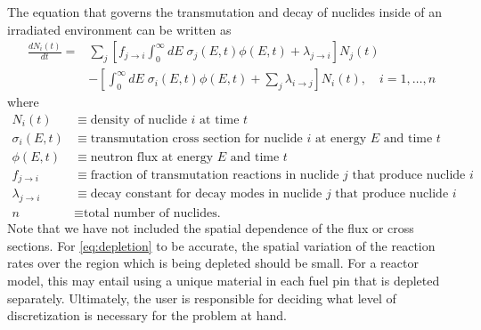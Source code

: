 \documentclass[3p,authoryear]{elsarticle}
\begin{document}
The equation that governs the transmutation and decay of nuclides inside of an
irradiated environment can be written as
\begin{equation}
  \label{eq:depletion}
  \begin{split}
  \frac{dN_i(t)}{dt} = &\sum\limits_j \left [ f_{j \rightarrow i}
  \int_0^\infty dE \; \sigma_j (E, t) \phi(E,t) + \lambda_{j\rightarrow i}
  \right ] N_j(t) \\ &- \left [\int_0^\infty dE \; \sigma_i (E,t) \phi(E,t) +
  \sum\limits_j \lambda_{i\rightarrow j} \right ] N_i(t), \quad i=1,\dots,n
  \end{split}
\end{equation}
where
\begin{equation*}
  \begin{split}
  N_i(t) &\equiv \text{density of nuclide $i$ at time $t$} \\
  \sigma_i(E,t) &\equiv \text{transmutation cross section for nuclide $i$ at energy $E$ and time $t$} \\
  \phi(E,t) &\equiv \text{neutron flux at energy $E$ and time $t$} \\
  f_{j \rightarrow i} &\equiv \text{fraction of transmutation reactions in nuclide $j$ that produce nuclide $i$} \\
  \lambda_{j \rightarrow i} &\equiv \text{decay constant for decay modes in nuclide $j$ that produce nuclide $i$} \\
  n &\equiv \text{total number of nuclides.}
  \end{split}
\end{equation*}
Note that we have not included the spatial dependence of the flux or cross
sections. For \cref{eq:depletion} to be accurate, the spatial variation of the
reaction rates over the region which is being depleted should be small. For a
reactor model, this may entail using a unique material in each fuel pin that is
depleted separately. Ultimately, the user is responsible for deciding what level
of discretization is necessary for the problem at hand.
\end{document}
